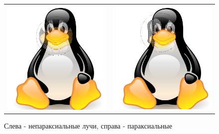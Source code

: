 \documentclass[a4paper,12pt]{article} %
\begin{document}
\begin{figure}[ht]\center
\begin{tabular}{cc}
\includegraphics[scale=0.4]{тукс_нон.png}
&
\includegraphics[scale=0.4]{тукс_паракс.png}
\end{tabular}
\caption{Слева - непараксиальные лучи, справа - параксиальные}
\end{figure}
\end{document}
